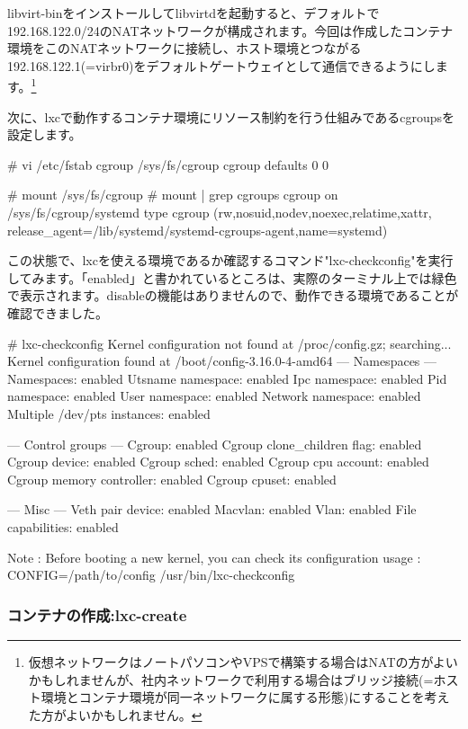 \documentclass[mingoth,a4paper]{jsarticle}
\begin{document}
libvirt-binをインストールしてlibvirtdを起動すると、デフォルトで192.168.122.0/24のNATネットワークが構成されます。今回は作成したコンテナ環境をこのNATネットワークに接続し、ホスト環境とつながる192.168.122.1(=virbr0)をデフォルトゲートウェイとして通信できるようにします。\footnote{仮想ネットワークはノートパソコンやVPSで構築する場合はNATの方がよいかもしれませんが、社内ネットワークで利用する場合はブリッジ接続(=ホスト環境とコンテナ環境が同一ネットワークに属する形態)にすることを考えた方がよいかもしれません。}


次に、lxcで動作するコンテナ環境にリソース制約を行う仕組みであるcgroupsを設定します。

\begin{commandline}
  # vi /etc/fstab
  cgroup  /sys/fs/cgroup  cgroup  defaults  0   0

  # mount /sys/fs/cgroup
  # mount | grep cgroups
  cgroup on /sys/fs/cgroup/systemd type cgroup (rw,nosuid,nodev,noexec,relatime,xattr,
  release_agent=/lib/systemd/systemd-cgroups-agent,name=systemd)
\end{commandline}

この状態で、lxcを使える環境であるか確認するコマンド"lxc-checkconfig"を実行してみます。「enabled」と書かれているところは、実際のターミナル上では緑色で表示されます。disableの機能はありませんので、動作できる環境であることが確認できました。

\begin{commandline}
  # lxc-checkconfig
  Kernel configuration not found at /proc/config.gz; searching...
  Kernel configuration found at /boot/config-3.16.0-4-amd64
  --- Namespaces ---
  Namespaces: enabled
  Utsname namespace: enabled
  Ipc namespace: enabled
  Pid namespace: enabled
  User namespace: enabled
  Network namespace: enabled
  Multiple /dev/pts instances: enabled

  --- Control groups ---
  Cgroup: enabled
  Cgroup clone_children flag: enabled
  Cgroup device: enabled
  Cgroup sched: enabled
  Cgroup cpu account: enabled
  Cgroup memory controller: enabled
  Cgroup cpuset: enabled

  --- Misc ---
  Veth pair device: enabled
  Macvlan: enabled
  Vlan: enabled
  File capabilities: enabled

  Note : Before booting a new kernel, you can check its configuration
  usage : CONFIG=/path/to/config /usr/bin/lxc-checkconfig
\end{commandline}

\subsubsection{コンテナの作成:lxc-create}
\end{document}
